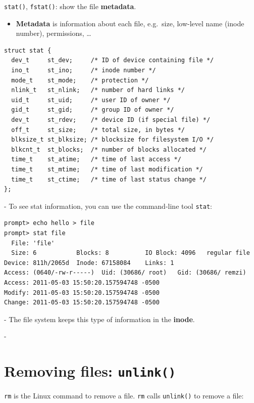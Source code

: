 \documentclass[11pt,a4paper]{article}
\makeatletter
\newcommand{\keepspace}[1]{\par\penalty-100\begingroup
  \setlength{\dimen@}{#1}\dimen@ii\pagegoal\advance\dimen@ii-\pagetotal
  \ifdim\dimen@>\dimen@ii\ifdim\dimen@ii>\z@\vfil\fi\break\fi\endgroup}
\makeatother
\begin{document}
\texttt{stat()}, \texttt{fstat()}: show the file \textbf{metadata}.
\begin{itemize}
  \item \textbf{Metadata} is information about each file, e.g.\ size,
        low-level name (inode number), permissions, \ldots
\end{itemize}

\begin{lstlisting}
struct stat {
  dev_t     st_dev;     /* ID of device containing file */
  ino_t     st_ino;     /* inode number */
  mode_t    st_mode;    /* protection */
  nlink_t   st_nlink;   /* number of hard links */
  uid_t     st_uid;     /* user ID of owner */
  gid_t     st_gid;     /* group ID of owner */
  dev_t     st_rdev;    /* device ID (if special file) */
  off_t     st_size;    /* total size, in bytes */
  blksize_t st_blksize; /* blocksize for filesystem I/O */
  blkcnt_t  st_blocks;  /* number of blocks allocated */
  time_t    st_atime;   /* time of last access */
  time_t    st_mtime;   /* time of last modification */
  time_t    st_ctime;   /* time of last status change */
};
\end{lstlisting}

\keepspace{7\baselineskip}
To see stat information, you can use the command-line tool \texttt{stat}:

\begin{lstlisting}[style=term]
prompt> echo hello > file
prompt> stat file
  File: 'file'
  Size: 6           Blocks: 8          IO Block: 4096   regular file
Device: 811h/2065d  Inode: 67158084    Links: 1
Access: (0640/-rw-r-----)  Uid: (30686/ root)   Gid: (30686/ remzi)
Access: 2011-05-03 15:50:20.157594748 -0500
Modify: 2011-05-03 15:50:20.157594748 -0500
Change: 2011-05-03 15:50:20.157594748 -0500
\end{lstlisting}

\keepspace{7\baselineskip}
The file system keeps this type of information in the \textbf{inode}.

\keepspace{7\baselineskip}
\section{Removing files: \texttt{unlink()}}

\texttt{rm} is the Linux command to remove a file. \texttt{rm} calls
\texttt{unlink()} to remove a file:
\end{document}
